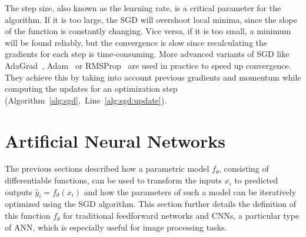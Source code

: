 The step size, also known as the learning rate, is a critical parameter for the algorithm. If it is too large, the \ac{SGD} will overshoot local minima, since the slope of the function is constantly changing. Vice versa, if it is too small, a minimum will be found reliably, but the convergence is slow since recalculating the gradients for each step is time-consuming. More advanced variants of \ac{SGD} like AdaGrad~\parencite{Duchi:2011}, Adam~\parencite{Kingma:2014} or RMSProp~\parencite{Hinton:2012} are used in practice to speed up convergence. They achieve this by taking into account previous gradients and momentum while computing the updates for an optimization step (Algorithm~\ref{alg:sgd},~Line~\ref{alg:sgd:update}).
\section{Artificial Neural Networks}
The previous sections described how a parametric model $f_\theta$, consisting of differentiable functions, can be used to transform the inputs $x_i$ to predicted outputs $\hat{y}_i = f_\theta(x_i)$ and how the parameters of such a model can be iteratively optimized using the \ac{SGD} algorithm. This section further details the definition of this function $f_\theta$ for traditional feedforward networks and \acp{CNN}, a particular type of \ac{ANN}, which is especially useful for image processing tasks.
